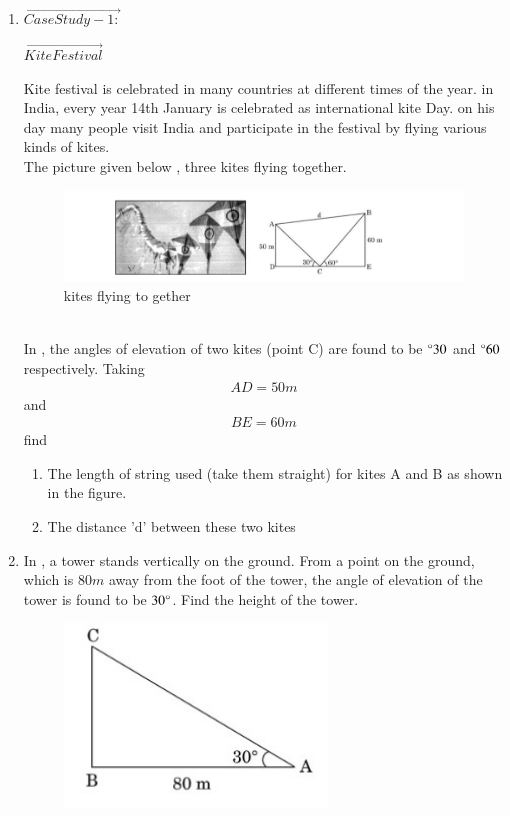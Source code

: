 \begin{enumerate}[label=\thesubsection.\arabic*.,ref=\thesubsection.\theenumi]
\item $\vec{Case Study - 1:}$
\begin{center}
$\vec{Kite Festival}$\\
\end{center}
Kite festival is celebrated in many countries at different times of the year. in India, every year 14th
January is celebrated as international kite Day. on his day many people visit India and participate in the festival by flying various kinds of kites.
\\The picture given below  , three kites flying together.
\begin{figure}[!ht]
\centering
\includegraphics[width=\columnwidth]{cbse/figs/kites}
\caption{kites flying to gether}
\label{fig:kites5}
\end{figure}
\\In {}, the angles of elevation of two kites (point C) are found to be $\degree{30}$ and  $\degree{60}$ respectively. Taking \begin{align}AD = 50 m\end{align} and\begin{align} BE = 60 m\end{align}
find
\begin{enumerate}
\item The length of string used (take them straight) for kites A and B as shown in the figure.
\item The distance 'd' between these two kites
\end{enumerate}
\hfill{}
\item In  , a tower stands vertically on the ground. From a point on the ground, which is $80m$ away from the foot of the tower, the angle of elevation of the tower is found to be $30\degree$. Find the height of the tower.
    \begin{figure}[H]
        \centering
        \includegraphics[width=70mm]{cbse/figs/as.jpeg}

\end{figure}
\end{enumerate}

